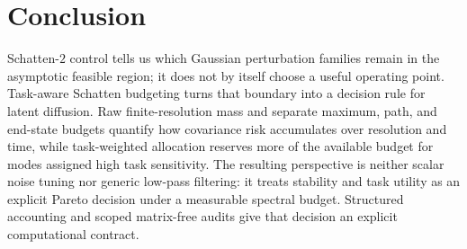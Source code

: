 \section{Conclusion}
\label{sec:conclusion}

Schatten-$2$ control tells us which Gaussian perturbation families remain in
the asymptotic feasible region; it does not by itself choose a useful operating
point. Task-aware Schatten budgeting turns that boundary into a decision rule
for latent diffusion. Raw finite-resolution mass and separate maximum, path,
and end-state budgets quantify how covariance risk accumulates over resolution
and time, while task-weighted allocation reserves more of the available budget
for modes assigned high task sensitivity. The resulting perspective
is neither scalar noise tuning nor generic low-pass filtering: it treats
stability and task utility as an explicit Pareto decision under a measurable
spectral budget. Structured accounting and scoped matrix-free audits give that
decision an explicit computational contract.

